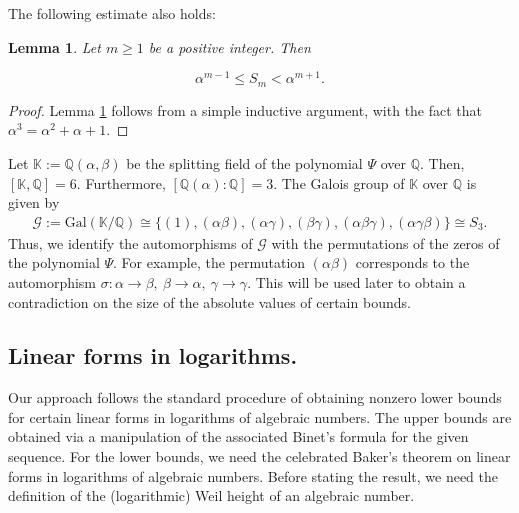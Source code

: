 \documentclass[10pt,a4paper]{article}
\newtheorem{lemma}{Lemma}
\begin{document}
\noindent The following estimate also holds:

\begin{lemma}\label{lem1}
Let $m \ge 1$ be a positive integer. Then

\begin{equation*}
\alpha^{m-1} \leq S_m < \alpha^{m+1}.
\end{equation*}
\end{lemma}
\begin{proof}
 Lemma \ref{lem1} follows from a simple inductive argument, with the fact that $ \alpha^3=\alpha^2+\alpha+1 $.
\end{proof}

\noindent
Let $ \mathbb{K}:=\mathbb{Q}(\alpha, \beta) $ be the splitting field of the polynomial $ \Psi $ over $ \mathbb{Q} $. Then, $ [\mathbb{K}, \mathbb{Q}]=6 $. Furthermore, $ [\mathbb{Q}(\alpha):\mathbb{Q}]=3 $. The Galois group of $ \mathbb{K} $ over $ \mathbb{Q} $ is given by
\begin{align*}
\mathcal{G}:=\text{Gal}(\mathbb{K/Q})\cong \{(1), (\alpha\beta),(\alpha\gamma), (\beta\gamma), (\alpha\beta\gamma), (\alpha\gamma\beta)\} \cong S_3.
\end{align*}
Thus, we identify the automorphisms of $ \mathcal{G} $ with the permutations of the zeros of the polynomial $ \Psi $. For example, the permutation $ (\alpha\beta) $ corresponds to the automorphism $ \sigma: \alpha \to \beta, ~\beta \to \alpha, ~\gamma \to \gamma $. This will be used later to obtain a contradiction on the size of the absolute values of certain bounds.


\subsection{Linear forms in logarithms.}
Our approach follows the standard procedure of obtaining nonzero lower bounds for certain linear forms in logarithms of algebraic numbers. The upper bounds are obtained via a manipulation of the associated Binet's formula for the given sequence. For the lower bounds, we need the celebrated Baker's theorem on linear forms in logarithms of algebraic numbers. Before stating the result, we need the definition of the (logarithmic) Weil height of an algebraic number.
\medskip
\end{document}
